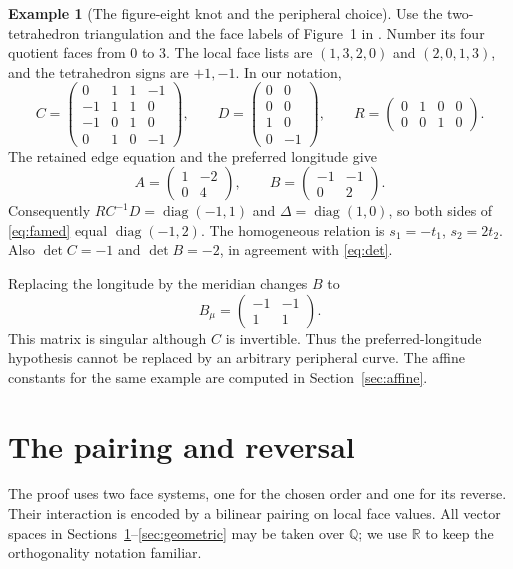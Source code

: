 \documentclass[11pt]{article}
\theoremstyle{definition}\newtheorem{definition}[theorem]{Definition}
\newtheorem{example}[theorem]{Example}
\theoremstyle{remark}\newtheorem{remark}[theorem]{Remark}
\DeclareMathOperator{\diag}{diag}
\newcommand{\R}{\mathbb R}
\newcommand{\Q}{\mathbb Q}
\begin{document}
\begin{example}[The figure-eight knot and the peripheral choice]\label{ex:figureeight}
Use the two-tetrahedron triangulation and the face labels of Figure~1 in \cite{RIMS}. Number its four quotient faces from $0$ to $3$. The local face lists are $(1,3,2,0)$ and $(2,0,1,3)$, and the tetrahedron signs are $+1,-1$. In our notation,
\[
C=\begin{pmatrix}
0&1&1&-1\\-1&1&1&0\\-1&0&1&0\\0&1&0&-1
\end{pmatrix},\qquad
D=\begin{pmatrix}0&0\\0&0\\1&0\\0&-1\end{pmatrix},\qquad
R=\begin{pmatrix}0&1&0&0\\0&0&1&0\end{pmatrix}.
\]
The retained edge equation and the preferred longitude give
\[
A=\begin{pmatrix}1&-2\\0&4\end{pmatrix},\qquad
B=\begin{pmatrix}-1&-1\\0&2\end{pmatrix}.
\]
Consequently $RC^{-1}D=\diag(-1,1)$ and $\Delta=\diag(1,0)$, so both sides of \eqref{eq:famed} equal $\diag(-1,2)$. The homogeneous relation is $s_1=-t_1$, $s_2=2t_2$. Also $\det C=-1$ and $\det B=-2$, in agreement with \eqref{eq:det}.

Replacing the longitude by the meridian changes $B$ to
\[B_\mu=\begin{pmatrix}-1&-1\\1&1\end{pmatrix}.
\]
This matrix is singular although $C$ is invertible. Thus the preferred-longitude hypothesis cannot be replaced by an arbitrary peripheral curve. The affine constants for the same example are computed in Section~\ref{sec:affine}.
\end{example}

\section{The pairing and reversal}\label{sec:pairing}
The proof uses two face systems, one for the chosen order and one for
its reverse. Their interaction is encoded by a bilinear pairing on
local face values. All vector spaces in Sections~\ref{sec:pairing}--\ref{sec:geometric}
may be taken over $\Q$; we use $\R$ to keep the orthogonality notation
familiar.
\end{document}

